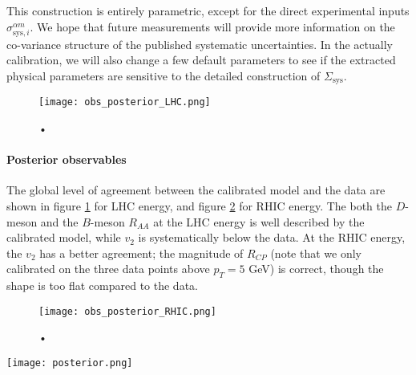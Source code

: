 This construction is entirely parametric, except for the direct experimental inputs $\sigma^{\alpha m}_{\textrm{sys}, i}$.
We hope that future measurements will provide more information on the co-variance structure of the published systematic uncertainties.
In the actually calibration, we will also change a few default parameters to see if the extracted physical parameters are sensitive to the detailed construction of $\Sigma_{\textrm{sys}}$.

\begin{figure}
\centering
\texttt{[image: obs\_posterior\_LHC.png]}
\caption{•}
\label{fig:new:obs_posterior_LHC}
\end{figure}

\paragraph{Posterior observables} The global level of agreement between the calibrated model and the data are shown in figure \ref{fig:new:obs_posterior_LHC} for LHC energy, and figure \ref{fig:new:obs_posterior_RHIC} for RHIC energy.
The both the $D$-meson and the $B$-meson $R_{AA}$ at the LHC energy is well described by the calibrated model, while $v_2$ is systematically below the data.
At the RHIC energy, the $v_2$ has a better agreement; the magnitude of $R_{CP}$ (note that we only calibrated on the three data points above $p_T=5$ GeV) is correct, though the shape is too flat compared to the data.

\begin{figure}
\centering
\texttt{[image: obs\_posterior\_RHIC.png]}
\caption{•}
\label{fig:new:obs_posterior_RHIC}
\end{figure}

\begin{figure*}
\centering
\texttt{[image: posterior.png]}
\caption{•}
\label{fig:new:posterior}
\end{figure*}

